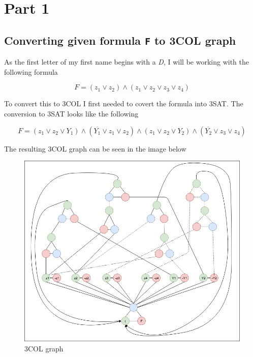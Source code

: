 \section{Part 1}

\subsection{Converting given formula \texttt{F} to 3COL graph}

As the first letter of my first name begins with a \textit{D}, I will be working with the following formula

\begin{equation}\label{eq:original-formula}
F = (z_1 \lor z_2) \land (z_1 \lor z_2 \lor z_3 \lor z_4) 
\end{equation}

To convert this to 3COL I first needed to covert the formula into 3SAT. The conversion to 3SAT looks like the following

\begin{equation}\label{eq:original-formula}
F = (z_1 \lor z_2 \lor Y_1) \land (\overline{Y_1} \lor z_1 \lor z_2) \land (z_1 \lor z_2 \lor Y_2) \land(\overline{Y_2} \lor z_3 \lor z_4)
\end{equation}

The resulting 3COL graph can be seen in the image below

\begin{figure}[h!]
\vspace{-5pt}
\centering
\includegraphics[width=1.0\textwidth]{images/3col.jpg}
\caption{\label{fig:3col_graph}3COL graph}
\end{figure}